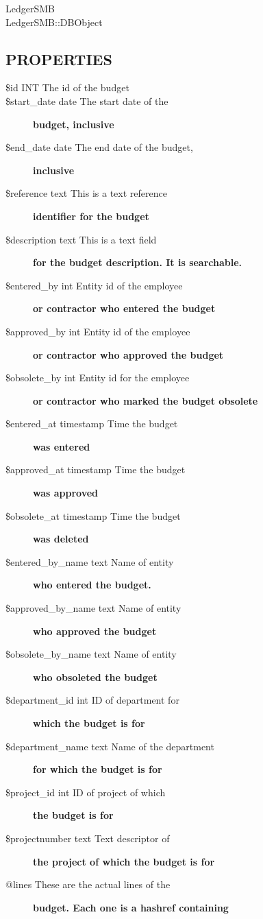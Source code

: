 \begin{description}
\begin{description}
\item[{LedgerSMB}] \mbox{}
\item[{LedgerSMB::DBObject}] \mbox{}\end{description}
\subsection*{PROPERTIES\label{LedgerSMB::DBObject::Budget_PROPERTIES}}
\begin{description}

\item[{\$id INT
   The id of the budget}] \mbox{}
\item[{\$start\_date date The start date of the}] \textbf{budget, inclusive}
\item[{\$end\_date date The end date of the budget,}] \textbf{inclusive}
\item[{\$reference text This is a text reference}] \textbf{identifier for the budget}
\item[{\$description text This is a text field}] \textbf{for the budget description. It is searchable.}
\item[{\$entered\_by int Entity id of the employee}] \textbf{or contractor who entered the budget}
\item[{\$approved\_by int Entity id of the employee}] \textbf{or contractor who approved the budget}
\item[{\$obsolete\_by int Entity id for the employee}] \textbf{or contractor who marked the budget obsolete}
\item[{\$entered\_at timestamp Time the budget}] \textbf{was entered}
\item[{\$approved\_at timestamp Time the budget}] \textbf{was approved}
\item[{\$obsolete\_at timestamp Time the budget}] \textbf{was deleted}
\item[{\$entered\_by\_name text Name of entity}] \textbf{who entered the budget.}
\item[{\$approved\_by\_name text Name of entity}] \textbf{who approved the budget}
\item[{\$obsolete\_by\_name text Name of entity}] \textbf{who obsoleted the budget}
\item[{\$department\_id int ID of department for}] \textbf{which the budget is for}
\item[{\$department\_name text Name of the department}] \textbf{for which the budget is for}
\item[{\$project\_id int ID of project of which}] \textbf{the budget is for}
\item[{\$projectnumber text Text descriptor of}] \textbf{the project of which the budget is for}
\item[{@lines These are the actual lines of the}] \textbf{budget. Each one is a hashref containing}\begin{description}


\end{description}
\end{description}
\end{description}
